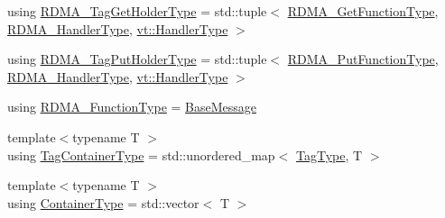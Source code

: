\begin{DoxyCompactItemize}
\item 
using \hyperlink{structvt_1_1rdma_1_1_state_a10b0ce4a13ce643ca2a944dd05c601ff}{R\+D\+M\+A\+\_\+\+Tag\+Get\+Holder\+Type} = std\+::tuple$<$ \hyperlink{structvt_1_1rdma_1_1_state_af0baaa6ac5c3b7b256d032f2ee845676}{R\+D\+M\+A\+\_\+\+Get\+Function\+Type}, \hyperlink{namespacevt_a9530efb893c0f3846e8ac5f0507e0f49}{R\+D\+M\+A\+\_\+\+Handler\+Type}, \hyperlink{namespacevt_af64846b57dfcaf104da3ef6967917573}{vt\+::\+Handler\+Type} $>$
\item 
using \hyperlink{structvt_1_1rdma_1_1_state_a8a25176f05bb2570889d6b41089ac1ca}{R\+D\+M\+A\+\_\+\+Tag\+Put\+Holder\+Type} = std\+::tuple$<$ \hyperlink{structvt_1_1rdma_1_1_state_aa43a5d043fe01086818e9c5c364341d4}{R\+D\+M\+A\+\_\+\+Put\+Function\+Type}, \hyperlink{namespacevt_a9530efb893c0f3846e8ac5f0507e0f49}{R\+D\+M\+A\+\_\+\+Handler\+Type}, \hyperlink{namespacevt_af64846b57dfcaf104da3ef6967917573}{vt\+::\+Handler\+Type} $>$
\item 
using \hyperlink{structvt_1_1rdma_1_1_state_afc917e98beaf9cde735f096552029f3a}{R\+D\+M\+A\+\_\+\+Function\+Type} = \hyperlink{namespacevt_ac34f95a5e2b8109b55bfba52b074443d}{Base\+Message}
\item 
{\footnotesize template$<$typename T $>$ }\\using \hyperlink{structvt_1_1rdma_1_1_state_ad84b403803cc575ef54d0d0ac74017e9}{Tag\+Container\+Type} = std\+::unordered\+\_\+map$<$ \hyperlink{namespacevt_a84ab281dae04a52a4b243d6bf62d0e52}{Tag\+Type}, T $>$
\item 
{\footnotesize template$<$typename T $>$ }\\using \hyperlink{structvt_1_1rdma_1_1_state_a7506401f1846be85f14e73e75b773a5d}{Container\+Type} = std\+::vector$<$ T $>$
\end{DoxyCompactItemize}
